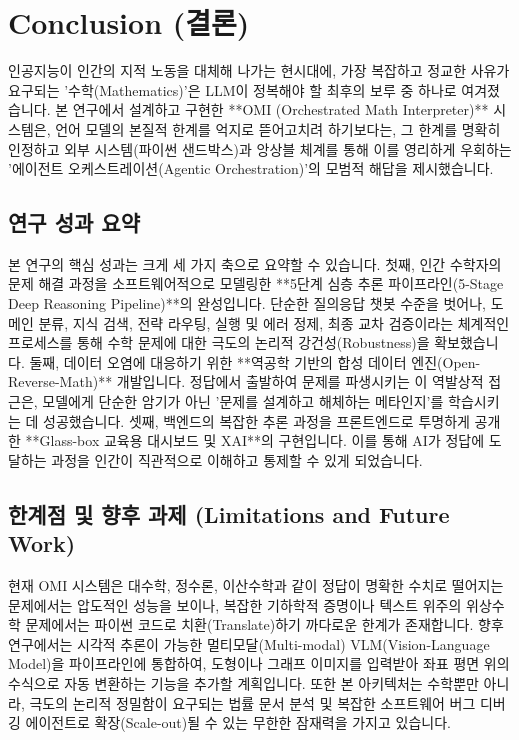 \section{Conclusion (결론)}

인공지능이 인간의 지적 노동을 대체해 나가는 현시대에, 가장 복잡하고 정교한 사유가 요구되는 '수학(Mathematics)'은 LLM이 정복해야 할 최후의 보루 중 하나로 여겨졌습니다. 본 연구에서 설계하고 구현한 **OMI (Orchestrated Math Interpreter)** 시스템은, 언어 모델의 본질적 한계를 억지로 뜯어고치려 하기보다는, 그 한계를 명확히 인정하고 외부 시스템(파이썬 샌드박스)과 앙상블 체계를 통해 이를 영리하게 우회하는 '에이전트 오케스트레이션(Agentic Orchestration)'의 모범적 해답을 제시했습니다.

\subsection{연구 성과 요약}
본 연구의 핵심 성과는 크게 세 가지 축으로 요약할 수 있습니다.
첫째, 인간 수학자의 문제 해결 과정을 소프트웨어적으로 모델링한 **5단계 심층 추론 파이프라인(5-Stage Deep Reasoning Pipeline)**의 완성입니다. 단순한 질의응답 챗봇 수준을 벗어나, 도메인 분류, 지식 검색, 전략 라우팅, 실행 및 에러 정제, 최종 교차 검증이라는 체계적인 프로세스를 통해 수학 문제에 대한 극도의 논리적 강건성(Robustness)을 확보했습니다.
둘째, 데이터 오염에 대응하기 위한 **역공학 기반의 합성 데이터 엔진(Open-Reverse-Math)** 개발입니다. 정답에서 출발하여 문제를 파생시키는 이 역발상적 접근은, 모델에게 단순한 암기가 아닌 '문제를 설계하고 해체하는 메타인지'를 학습시키는 데 성공했습니다.
셋째, 백엔드의 복잡한 추론 과정을 프론트엔드로 투명하게 공개한 **Glass-box 교육용 대시보드 및 XAI**의 구현입니다. 이를 통해 AI가 정답에 도달하는 과정을 인간이 직관적으로 이해하고 통제할 수 있게 되었습니다.

\subsection{한계점 및 향후 과제 (Limitations and Future Work)}
현재 OMI 시스템은 대수학, 정수론, 이산수학과 같이 정답이 명확한 수치로 떨어지는 문제에서는 압도적인 성능을 보이나, 복잡한 기하학적 증명이나 텍스트 위주의 위상수학 문제에서는 파이썬 코드로 치환(Translate)하기 까다로운 한계가 존재합니다. 
향후 연구에서는 시각적 추론이 가능한 멀티모달(Multi-modal) VLM(Vision-Language Model)을 파이프라인에 통합하여, 도형이나 그래프 이미지를 입력받아 좌표 평면 위의 수식으로 자동 변환하는 기능을 추가할 계획입니다. 또한 본 아키텍처는 수학뿐만 아니라, 극도의 논리적 정밀함이 요구되는 법률 문서 분석 및 복잡한 소프트웨어 버그 디버깅 에이전트로 확장(Scale-out)될 수 있는 무한한 잠재력을 가지고 있습니다.
\newpage
